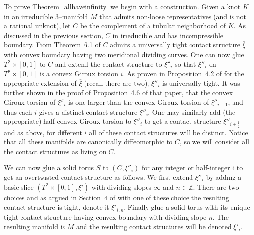 \documentclass[11pt]{amsart}
\theoremstyle{plain}
\theoremstyle{definition}
\theoremstyle{remark}
\numberwithin{theorem}{section}
\newcommand{\Z}{\mathbb{Z}}           %
\begin{document}
 To prove Theorem~\ref{allhaveinfinity} we begin with a construction. Given a knot $K$ in an irreducible $3$--manifold $M$ that admits non-loose representatives (and is not a rational unknot), let $C$ be the complement of a tubular neighborhood of $K$. As discussed in the previous section, $C$ in irreducible and has incompressible boundary. From Theorem~6.1 of \cite{HondaKazezMatic00} $C$ admits a universally tight contact structure $\overline\xi$ with convex boundary having two meridional dividing curves. One can now glue $T^2\times [0,1]$ to $C$ and extend the contact structure to $\xi''_i$ so that $\xi''_i$ on $T^2\times [0,1]$ is a convex Giroux torsion $i$. As proven in Proposition~4.2 of \cite{HondaKazezMatic02} for the appropriate extension of $\overline{\xi}$ (recall there are two), $\xi''_i$ is universally tight. It was further shown in the proof of Proposition~4.6 of that paper, that the convex Giroux torsion of $\xi''_i$ is  one larger than the convex Giroux torsion of $\xi''_{i-1}$, and thus each $i$ gives a distinct contact structure $\xi''_i$. One may similarly add (the appropriate) half convex Giroux torsion to $\xi''_i$ to get a contact structure $\xi''_{i+\frac 12}$ and as above, for different $i$ all of these contact structures will be distinct. Notice that all these manifolds are canonically diffeomorphic to $C$, so we will consider all the contact structures as living on $C$. 

We can now glue a solid torus $S$ to $(C,\xi''_i)$ for any integer or half-integer $i$ to get an overtwisted contact structure as follows. We first extend $\xi''_i$ by adding a basic slice $(T^2\times[0,1], \xi')$ with dividing slopes $\infty$ and $n\in \Z$. There are two choices and as argued in Section~4 of \cite{HondaKazezMatic02} with one of these choice the resulting contact structure is tight, denote it $\xi'_{i,n}$. Finally glue a solid torus with its unique tight contact structure having convex boundary with dividing slope $n$. The resulting manifold is $M$ and the resulting contact structures will be denoted $\xi'_i$. 
\end{document}
